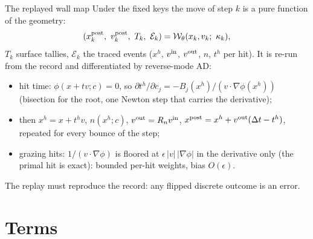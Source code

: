 \begin{frame}{The replayed wall map}
Under the fixed keys the move of step $k$ is a pure function of the geometry:
\[
(x^{\mathrm{post}}_k,\ v^{\mathrm{post}}_k,\ T_k,\ \mathcal E_k) = \mathcal W_\theta(x_k, v_k;\ \kappa_k),
\]
$T_k$ surface tallies, $\mathcal E_k$ the traced events ($x^h$, $v^{\mathrm{in}}$, $v^{\mathrm{out}}$, $n$, $t^h$ per hit).
It is re-run from the record and differentiated by reverse-mode AD:
\begin{itemize}
\item hit time: $\phi(x + t v; c) = 0$, so $\partial t^h/\partial c_j = -B_j(x^h)/(v\cdot\nabla\phi(x^h))$
  (bisection for the root, one Newton step that carries the derivative);
\item then $x^h = x + t^h v$, $n(x^h; c)$, $v^{\mathrm{out}} = R_n v^{\mathrm{in}}$,
  $x^{\mathrm{post}} = x^h + v^{\mathrm{out}}(\Delta t - t^h)$, repeated for every bounce of the step;
\item grazing hits: $1/(v\cdot\nabla\phi)$ is floored at $\epsilon\,|v|\,|\nabla\phi|$ in the
  derivative only (the primal hit is exact): bounded per-hit weights, bias $O(\epsilon)$.
\end{itemize}
The replay must reproduce the record: any flipped discrete outcome is an error.
\end{frame}

\section{Terms}

